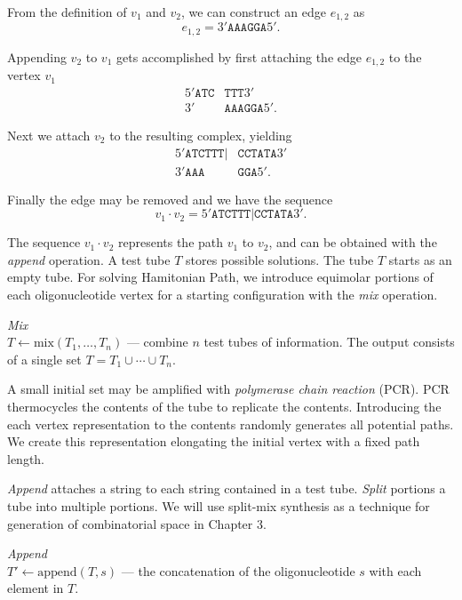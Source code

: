 \noindent From the definition of $v_1$ and $v_2$, we can construct an edge $e_{1,2}$ as
\[
e_{1,2} = 3'\texttt{AAAGGA}5'.
\]

\noindent Appending $v_2$ to $v_1$ gets accomplished by first attaching the edge $e_{1,2}$ to the vertex $v_1$
\begin{align*}
 5'\texttt{ATC}&\texttt{TTT}3' \\
  3'&\texttt{AAAGGA}5'.
\end{align*}

\noindent Next we attach $v_2$ to the resulting complex, yielding
\begin{align*}
 5'\texttt{ATCTTT}|&\texttt{CCTATA}3'\\
  3'\texttt{AAA}&\texttt{GGA}5'.
\end{align*}

\noindent Finally the edge may be removed and we have the sequence
\[
v_1 \cdot v_2 = 5'\texttt{ATCTTT}|\texttt{CCTATA}3'.
\]

The sequence $v_1 \cdot v_2$ represents the path $v_1$ to $v_2$, and can be obtained with the \textit{append} operation.  A test tube $T$ stores possible solutions.  The tube $T$ starts as an empty tube.  For solving {\sc Hamitonian Path}, we introduce equimolar portions of each oligonucleotide vertex for a starting configuration with the \textit{mix} operation.

\begin{definition}
\textit{Mix}\\
$ T \leftarrow \text{mix}( T_1, \ldots , T_n)$ --- combine $n$ test tubes of information.  The output consists of a single set $T = T_1 \cup \cdots \cup T_n$.
\end{definition}

A small initial set may be amplified with \textit{polymerase chain reaction} (PCR).  PCR thermocycles the contents of the tube to replicate the contents.  Introducing the each vertex representation to the contents randomly generates all potential paths.  We create this representation elongating the initial vertex with a fixed path length.

\textit{Append} attaches a string to each string contained in a test tube.  \textit{Split} portions a tube into multiple portions.  We will use split-mix synthesis as a technique for generation of combinatorial space in Chapter 3.

\begin{definition}
\textit{Append}\\
$T' \leftarrow \text{append}( T, s)$ --- the concatenation of the oligonucleotide $s$ with each element in $T$.  
\end{definition}

